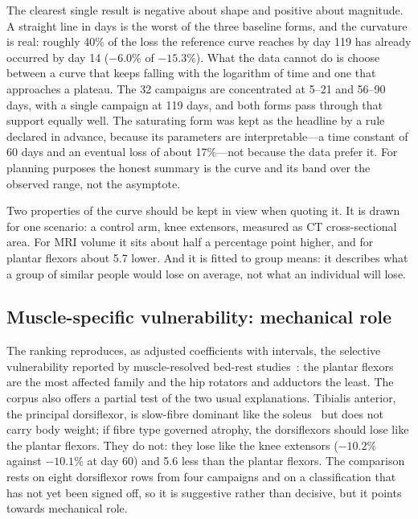 The clearest single result is negative about shape and positive about magnitude. A straight line in days is the worst
of the three baseline forms, and the curvature is real: roughly 40\% of the loss the reference curve reaches by day
119 has already occurred by day 14 ($-6.0\%$ of $-15.3\%$). What the data cannot do is choose between a curve that
keeps falling with the logarithm of time and one that approaches a plateau. The 32 campaigns are concentrated at 5--21
and 56--90 days, with a single campaign at 119 days, and both forms pass through that support equally well. The
saturating form was kept as the headline by a rule declared in advance, because its parameters are interpretable---a
time constant of 60 days and an eventual loss of about 17\%---not because the data prefer it. For planning purposes
the honest summary is the curve and its band over the observed range, not the asymptote.

Two properties of the curve should be kept in view when quoting it. It is drawn for one scenario: a control arm, knee
extensors, measured as CT cross-sectional area. For MRI volume it sits about half a percentage point higher, and for
plantar flexors about 5.7\pp{} lower. And it is fitted to group means: it describes what a group of similar people
would lose on average, not what an individual will lose.

\subsection{Muscle-specific vulnerability: mechanical role}

The ranking reproduces, as adjusted coefficients with intervals, the selective vulnerability reported by
muscle-resolved bed-rest studies~\citep{belavy2009,miokovic2012,marusic2021}: the plantar flexors are the most
affected family and the hip rotators and adductors the least. The corpus also offers a partial test of the two usual
explanations. Tibialis anterior, the principal dorsiflexor, is slow-fibre dominant like the soleus~\citep{johnson1973}
but does not carry body weight; if fibre type governed atrophy, the dorsiflexors should lose like the plantar flexors.
They do not: they lose like the knee extensors ($-10.2\%$ against $-10.1\%$ at day 60) and 5.6\pp{} less than the
plantar flexors. The comparison rests on eight dorsiflexor rows from four campaigns and on a classification that has
not yet been signed off, so it is suggestive rather than decisive, but it points towards mechanical role.

